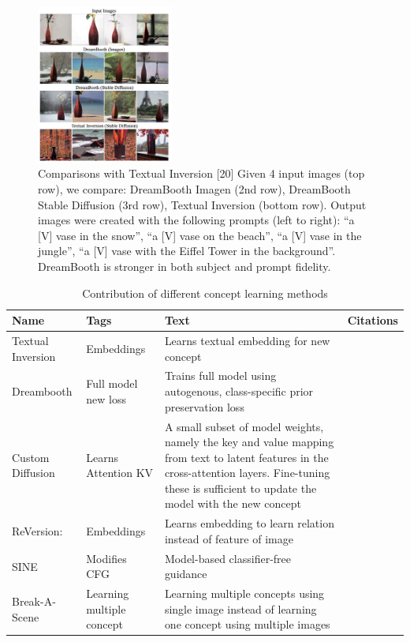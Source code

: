 \begin{figure}[H]
    \centering
    \includegraphics[width=0.4\textwidth]{images/dreambooth_ti_comp.png}
    \caption{Comparisons with Textual Inversion [20] Given 4
    input images (top row), we compare: DreamBooth Imagen (2nd
    row), DreamBooth Stable Diffusion (3rd row), Textual Inversion
    (bottom row). Output images were created with the following
    prompts (left to right): “a [V] vase in the snow”, “a [V] vase on
    the beach”, “a [V] vase in the jungle”, “a [V] vase with the Eiffel
    Tower in the background”. DreamBooth is stronger in both subject
    and prompt fidelity. \cite*{dreambooth}}
\end{figure}

\begin{table}[h!]
    \centering
    \begin{tabular}{ | m{5em} | m{5cm}| m{8cm} | m{2cm} | }
    \hline
    \textbf{Name} & \textbf{Tags} & \textbf{Text} & \textbf{Citations} \\
    \hline
    Textual Inversion & Embeddings & Learns textual embedding for new concept &  \\
    \hline
    Dreambooth & Full model \newline new loss & Trains full model using autogenous, class-specific prior preservation loss & \cite*{dreambooth}  \\
    \hline
    Custom Diffusion & Learns Attention KV & A small subset of model weights, namely the key and value mapping from text to latent features in the cross-attention layers. Fine-tuning these is sufficient to update the model with the new concept & \cite{customDiffusion} \\
    \hline
    ReVersion: & Embeddings & Learns embedding to learn relation instead of feature of image & \cite{reVersion} \\
    \hline
    SINE & Modifies CFG & Model-based classifier-free guidance & \cite{sine}\\
    \hline
    Break-A-Scene & Learning multiple concept & Learning multiple concepts using single image instead of learning one concept using multiple images & \\
    \hline
    \end{tabular}
    \caption{Contribution of different concept learning methods}
\end{table}
    